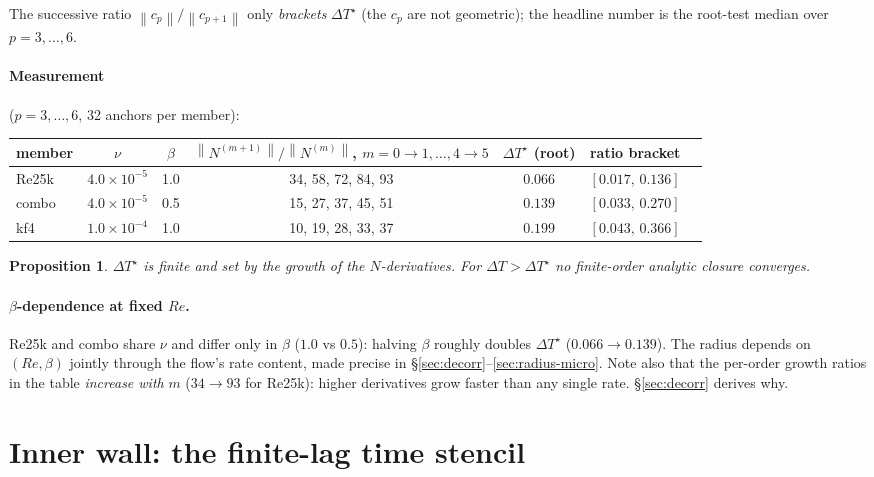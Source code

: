 \documentclass[11pt]{article}
\newtheorem{proposition}{Proposition}
\theoremstyle{remark}
\newcommand{\DT}{\Delta T}
\newcommand{\DTs}{\Delta T^{\star}}
\newcommand{\norm}[1]{\left\lVert #1 \right\rVert}
\begin{document}
The successive ratio $\norm{c_p}/\norm{c_{p+1}}$ only \emph{brackets} $\DTs$
(the $c_p$ are not geometric); the headline number is the root-test median
over $p = 3,\dots,6$.

\paragraph{Measurement} ($p = 3,\dots,6$, 32 anchors per member):

\begin{center}\small
\begin{tabular}{lcccccc}
\toprule
member & $\nu$ & $\beta$ &
$\norm{N^{(m+1)}}/\norm{N^{(m)}}$, $m{=}0{\to}1,\dots,4{\to}5$ &
$\DTs$ (root) & ratio bracket\\
\midrule
Re25k & $4.0{\times}10^{-5}$ & 1.0 & 34, 58, 72, 84, 93 & $\mathbf{0.066}$ & $[0.017,\,0.136]$\\
combo & $4.0{\times}10^{-5}$ & 0.5 & 15, 27, 37, 45, 51 & $\mathbf{0.139}$ & $[0.033,\,0.270]$\\
kf4   & $1.0{\times}10^{-4}$ & 1.0 & 10, 19, 28, 33, 37 & $\mathbf{0.199}$ & $[0.043,\,0.366]$\\
\bottomrule
\end{tabular}
\end{center}

\begin{proposition}\label{prop:radius}
$\DTs$ is finite and set by the growth of the $N$-derivatives. For
$\DT > \DTs$ no finite-order analytic closure converges.
\end{proposition}

\paragraph{$\beta$-dependence at fixed $Re$.}
Re25k and combo share $\nu$ and differ only in $\beta$ ($1.0$ vs $0.5$):
halving $\beta$ roughly doubles $\DTs$ ($0.066 \to 0.139$). The radius
depends on $(Re,\beta)$ jointly through the flow's rate content, made
precise in \S\ref{sec:decorr}--\ref{sec:radius-micro}. Note also that the
per-order growth ratios in the table \emph{increase with} $m$
($34 \to 93$ for Re25k): higher derivatives grow faster than any single
rate. \S\ref{sec:decorr} derives why.

\section{Inner wall: the finite-lag time stencil}\label{sec:inner}
\end{document}
